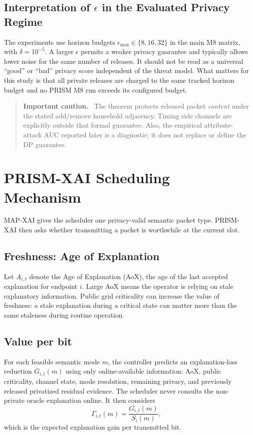\documentclass[11pt]{article}
\newenvironment{cautionbox}{%
  \begin{quote}\small\noindent\textbf{Important caution.}\ }{\end{quote}}
\begin{document}
\subsection{Interpretation of \texorpdfstring{$\epsilon$}{epsilon} in the Evaluated Privacy Regime}
The experiments use horizon budgets $\epsilon_{\max}\in\{8,16,32\}$ in the main M8 matrix, with $\delta=10^{-5}$. A larger $\epsilon$ permits a weaker privacy guarantee and typically allows lower noise for the same number of releases. It should not be read as a universal ``good'' or ``bad'' privacy score independent of the threat model. What matters for this study is that all private releases are charged to the same tracked horizon budget and no PRISM M8 run exceeds its configured budget.

\begin{cautionbox}
The theorem protects released packet \emph{content} under the stated add/remove household adjacency. Timing side channels are explicitly outside that formal guarantee. Also, the empirical attribute-attack AUC reported later is a diagnostic; it does not replace or define the DP guarantee.
\end{cautionbox}

\section{PRISM-XAI Scheduling Mechanism}
MAP-XAI gives the scheduler one privacy-valid semantic packet type. PRISM-XAI then asks whether transmitting a packet is worthwhile at the current slot.

\subsection{Freshness: Age of Explanation}
Let $A_{i,t}$ denote the Age of Explanation (AoX), the age of the last accepted explanation for endpoint $i$. Large AoX means the operator is relying on stale explanatory information. Public grid criticality can increase the value of freshness: a stale explanation during a critical state can matter more than the same staleness during routine operation.

\subsection{Value per bit}
For each feasible semantic mode $m$, the controller predicts an explanation-loss reduction $G_{i,t}(m)$ using only online-available information: AoX, public criticality, channel state, mode resolution, remaining privacy, and previously released privatized residual evidence. The scheduler never consults the non-private oracle explanation online. It then considers
\[
\Gamma_{i,t}(m)=\frac{G_{i,t}(m)}{S_i(m)},
\]
which is the expected explanation gain per transmitted bit.
\end{document}
